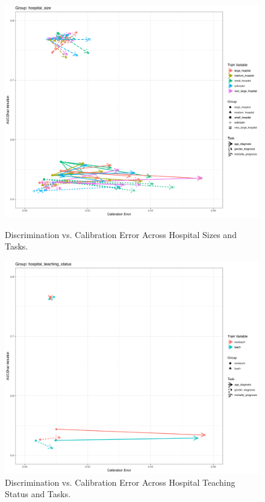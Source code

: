 \documentclass[10.7pt,]{article}
\begin{document}
\newpage
\begin{figure}[ht]
\centering
\begin{minipage}{\textwidth}
  \centering
  \includegraphics[height=0.45\textheight]{./figures/figure2.png}  %
  \caption{Discrimination vs. Calibration Error Across Hospital Sizes and Tasks.}
  \label{fig:figure2}
\end{minipage}

\vspace{1cm}  

\begin{minipage}{\textwidth}
  \centering
  \includegraphics[height=0.45\textheight]{./figures/figure3.png}  %
  \caption{Discrimination vs. Calibration Error Across Hospital Teaching Status and Tasks.}
  \label{fig:figure3}
\end{minipage}
\end{figure}
\end{document}
